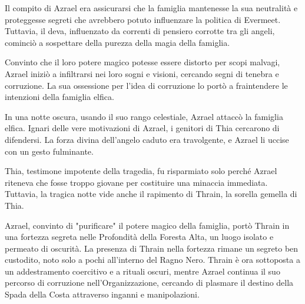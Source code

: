 \documentclass{article}
\begin{document}
Il compito di Azrael era assicurarsi che la famiglia mantenesse la sua neutralità e proteggesse segreti che avrebbero potuto influenzare la politica di Evermeet. Tuttavia, il deva, influenzato da correnti di pensiero corrotte tra gli angeli, cominciò a sospettare della purezza della magia della famiglia.

Convinto che il loro potere magico potesse essere distorto per scopi malvagi, Azrael iniziò a infiltrarsi nei loro sogni e visioni, cercando segni di tenebra e corruzione. La sua ossessione per l'idea di corruzione lo portò a fraintendere le intenzioni della famiglia elfica.

In una notte oscura, usando il suo rango celestiale, Azrael attaccò la famiglia elfica. Ignari delle vere motivazioni di Azrael, i genitori di Thia cercarono di difendersi. La forza divina dell'angelo caduto era travolgente, e Azrael li uccise con un gesto fulminante.

Thia, testimone impotente della tragedia, fu risparmiato solo perché Azrael riteneva che fosse troppo giovane per costituire una minaccia immediata. Tuttavia, la tragica notte vide anche il rapimento di Thrain, la sorella gemella di Thia.

Azrael, convinto di "purificare" il potere magico della famiglia, portò Thrain in una fortezza segreta nelle Profondità della Foresta Alta, un luogo isolato e permeato di oscurità. La presenza di Thrain nella fortezza rimane un segreto ben custodito, noto solo a pochi all'interno del Ragno Nero. Thrain è ora sottoposta a un addestramento coercitivo e a rituali oscuri, mentre Azrael continua il suo percorso di corruzione nell'Organizzazione, cercando di plasmare il destino della Spada della Costa attraverso inganni e manipolazioni.
\end{document}

